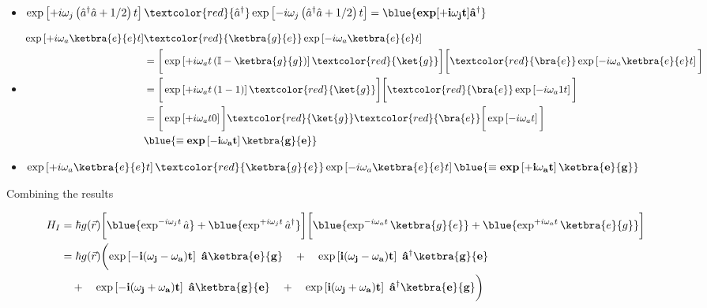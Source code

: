 \begin{itemize}
	\item $\exp\left[+i\omega_j\left(\hat{a}^\dagger\hat{a}+{1}/{2}\right)t\right]\textcolor{red}{\hat{a}^\dagger}\exp\left[-i\omega_j\left(\hat{a}^\dagger\hat{a}+{1}/{2}\right)t\right] = \blue{\mathbf{\text{\textbf{exp}}[+i\omega_jt]\hat{a}^\dagger}}$
	
	\item \begin{equation}
	\begin{aligned}
	\exp\left[+i\omega_a\ketbra{e}{e}t\right]&\textcolor{red}{\ketbra{g}{e}}\exp\left[-i\omega_a\ketbra{e}{e}t\right] \\
	& = \bigg[\exp\left[+i\omega_at\left(\mathbb{I} - \ketbra{g}{g}\right)\right]\textcolor{red}{\ket{g}}\bigg]\bigg[\textcolor{red}{\bra{e}}\exp\left[-i\omega_a\ketbra{e}{e}t\right]\bigg]\\
	& = \bigg[\exp\left[+i\omega_at\left(1 - 1\right)\right]\textcolor{red}{\ket{g}}\bigg]\bigg[\textcolor{red}{\bra{e}}\exp\left[-i\omega_a1t\right]\bigg]\\
	& = \bigg[\exp\left[+i\omega_at0\right]\bigg]\textcolor{red}{\ket{g}}\textcolor{red}{\bra{e}}\bigg[\exp\left[-i\omega_at\right]\bigg]\\
	& \blue{\mathbf{\equiv \text{\textbf{exp}}\left[-i\omega_at\right]\ketbra{g}{e}}}
	\end{aligned}
	\end{equation}
	\item $\exp\left[+i\omega_a\ketbra{e}{e}t\right]\textcolor{red}{\ketbra{g}{e}}\exp\left[-i\omega_a\ketbra{e}{e}t\right] \blue{\mathbf{\equiv \text{\textbf{exp}}\left[+i\omega_at\right]\ketbra{e}{g}}} $
\end{itemize}

Combining the results

\begin{equation}
\begin{aligned}
H_I & = \hbar g(\vec{r})\bigg[\blue{\exp^{-i\omega_jt}\hat{a}}+\blue{\exp^{+i\omega_jt}\hat{a}^\dagger}\bigg]\bigg[\blue{\exp^{-i\omega_at}\ketbra{g}{e}}+\blue{\exp^{+i\omega_at}\ketbra{e}{g}}\bigg] \\
& = \hbar g(\vec{r})\bigg(\mathbf{\exp\left[-i(\omega_j-\omega_a)t\right]\ \hat{a}\ketbra{e}{g}} \quad + \quad \mathbf{\exp\left[i(\omega_j-\omega_a)t\right]\ \hat{a}^\dagger\ketbra{g}{e}} \\
& \quad + \quad \mathbf{\exp\left[-i(\omega_j+\omega_a)t\right]\ \hat{a}\ketbra{g}{e}} \quad + \quad \mathbf{\exp\left[i(\omega_j+\omega_a)t\right]\ \hat{a}^\dagger\ketbra{e}{g}}\bigg)
\end{aligned}
\label{eqn:fullHamiltonianLightAtom}
\end{equation}

